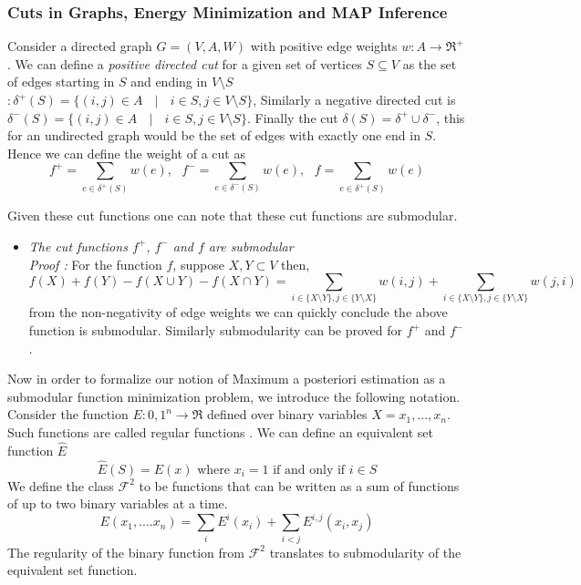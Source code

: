 \subsubsection{Cuts in Graphs, Energy Minimization and MAP Inference}
Consider a directed graph $G = (V,A,W)$ with positive edge weights $w:A\rightarrow\Re^+$. We can define a {\it positive directed cut} for a given set of vertices $S\subseteq V$ as the set of edges starting in $S$ and ending in $V\setminus S$ $:\delta^+(S) = \{(i,j)\in A\text{ }\mid \text{ }i \in S, j\in V\setminus S\}$, Similarly a negative directed cut is $\delta^-(S) = \{(i,j)\in A\text{ }\mid \text{ }i \in S, j\in V\setminus S\}$. Finally the cut $\delta(S) = \delta^+\cup\delta^-$, this for an undirected graph would be the set of edges with exactly one end in $S$. Hence we can define the weight of a cut as
\[
 f^+ = \underset{e\in\delta^+(S)}{\operatorname{\sum}} w(e), \text{ }  f^- = \underset{e\in\delta^-(S)}{\operatorname{\sum}} w(e), \text{ } f = \underset{e\in\delta^+(S)}{\operatorname{\sum}} w(e)
\]

Given these cut functions one can note that these cut functions are submodular.

\begin{itemize}
\item {\bf \lemma} {\it The cut functions $f^+$, $f^-$ and $f$ are submodular}\\
{\it Proof :} For the function $f$, suppose $X,Y\subset V$ then,
\[
f(X) + f(Y) - f(X\cup Y) - f(X\cap Y) = \underset{i\in\{X\setminus Y\}, j\in\{Y\setminus X\}}{\operatorname{\sum}} w(i,j) + \underset{i\in\{X\setminus Y\}, j\in\{Y\setminus X\}}{\operatorname{\sum}} w(j,i)
\]
from the non-negativity of edge weights we can quickly conclude the above function is submodular. Similarly submodularity can be proved for $f^+$ and $f^-$.
\end{itemize}
 Now in order to formalize our notion of Maximum a posteriori estimation as a submodular function minimization problem, we introduce the following notation. Consider the function $E:{0,1}^n\rightarrow\Re$ defined over binary variables $X={x_1,...,x_n}$. Such functions are called regular functions \cite{Kolmogorov04whatenergy}. We can define an equivalent set function $\hat{E}$
\[
\hat{E}(S) = E(x) \text{ where } x_i = 1 \text{ if and only if } i \in S
\]
We define the class $\mathcal{F}^2$ to be functions that can be written as a sum of functions of up to two binary variables at a time.
\[
E(x_1,....x_n) = \underset{i}{\operatorname{\sum}} E^i(x_i) + \underset{i<j}{\operatorname{\sum}} E^{i,j}(x_i,x_j)
\]
The regularity of the binary function from $\mathcal{F}^2$ translates to submodularity of the equivalent set function. 

